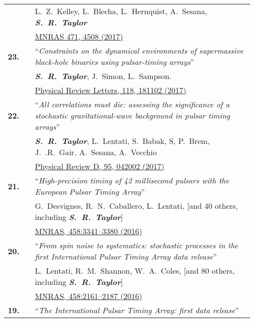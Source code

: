 \documentclass[11pt,letterpaper,sans]{moderncv}
\begin{document}
{\begin{longtable}{rp{0.3cm}p{15.8cm}}
&& L.~Z.~Kelley, L.~Blecha, L.~Hernquist, A.~Sesana, \textit{\textbf{S.~R.~Taylor}} \\ 
&& \href{https://academic.oup.com/mnras/article/471/4/4508/3899130/The-gravitational-wave-background-from-massive}{{\color{color1} MNRAS 471, 4508 (2017)}} \vspace{0.09cm}\\
\textbf{23.} & & ``\textit{Constraints on the dynamical environments of supermassive black-hole binaries using pulsar-timing arrays}'' \\ 
&& \textit{\textbf{S.~R.~Taylor}}, J.~Simon, L.~Sampson. \\
&& \href{https://journals.aps.org/prl/abstract/10.1103/PhysRevLett.118.181102}{{\color{color1} Physical Review Letters, 118, 181102 (2017)}} \vspace{0.09cm}\\
\textbf{22.} & & ``\textit{All correlations must die: assessing the significance of a stochastic gravitational-wave background in pulsar timing arrays}'' \\ 
&& \textit{\textbf{S.~R.~Taylor}},  L.~Lentati, S.~Babak, S, P.~Brem, J.~.R.~Gair, A.~Sesana, A.~Vecchio \\ 
&&  \href{https://journals.aps.org/prd/abstract/10.1103/PhysRevD.95.042002}{{\color{color1} Physical Review D, 95, 042002 (2017)}} \vspace{0.09cm}\\
\textbf{21.} & & ``\textit{High-precision timing of 42 millisecond pulsars with the European Pulsar Timing Array}'' \\ 
&& G.~Desvignes, R.~N.~Caballero, L.~Lentati, [and 40 others, including \textit{\textbf{S.~R.~Taylor}}] \\ 
&&  \href{http://mnras.oxfordjournals.org/content/458/3/3341}{{\color{color1} MNRAS, 458:3341--3380 (2016)}} \vspace{0.09cm}\\
\textbf{20.} & & ``\textit{From spin noise to systematics: stochastic processes in the first International Pulsar Timing Array data release}'' \\ 
&& L.~Lentati, R.~M.~Shannon, W.~A.~Coles, [and 80 others, including \textit{\textbf{S.~R.~Taylor}}] \\ 
&&  \href{http://mnras.oxfordjournals.org/content/458/2/2161}{{\color{color1} MNRAS, 458:2161--2187 (2016)}} \vspace{0.09cm}\\
\textbf{19.} & & ``\textit{The International Pulsar Timing Array: first data release}'' \\ 

\end{longtable}}
\end{document}
